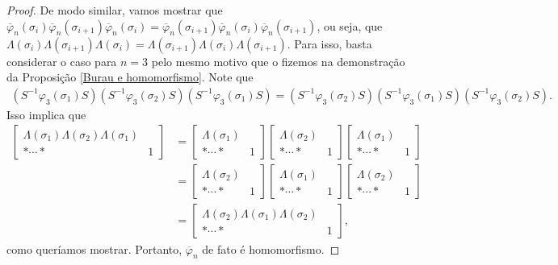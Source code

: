 \begin{proof}
		\par\vspace{0.3cm} De modo similar, vamos mostrar que
		$\overline{\varphi}_n(\sigma_i)\overline{\varphi}_n(\sigma_{i+1})\overline{\varphi}_n(\sigma_i) 
		= \overline{\varphi}_n(\sigma_{i+1})\overline{\varphi}_n(\sigma_i)\overline{\varphi}_n(\sigma_{i+1})$, 
		ou seja, que $\Lambda(\sigma_i)\Lambda(\sigma_{i+1})\Lambda(\sigma_i) =
		\Lambda(\sigma_{i+1})\Lambda(\sigma_i)\Lambda(\sigma_{i+1})$. 
		Para isso, basta considerar o caso para $n=3$ pelo mesmo motivo que o fizemos na demonstração da
		Proposição \ref{Burau e homomorfismo}. Note que
		\begin{align*}
		    (S^{-1}\varphi_3(\sigma_1)S)(S^{-1}\varphi_3(\sigma_2)S)(S^{-1}\varphi_3(\sigma_1)S) 
		    = (S^{-1}\varphi_3(\sigma_2)S)(S^{-1}\varphi_3(\sigma_1)S)(S^{-1}\varphi_3(\sigma_2)S).
		\end{align*}
		Isso implica que
		\begin{align*}
    		\left[\begin{array}{c|c}
    		\Lambda(\sigma_1)\Lambda(\sigma_2)\Lambda(\sigma_1) & \\
    		\hline 
    		\ast\cdots\ast & 1
    		\end{array}\right] &= \left[\begin{array}{c|c}
    		\Lambda(\sigma_1) & \\
    		\hline
    		\ast\cdots\ast & 1
    		\end{array}\right]\left[\begin{array}{c|c}
    		\Lambda(\sigma_2) & \\
    		\hline
    		\ast\cdots\ast & 1
    		\end{array}\right]\left[\begin{array}{c|c}
    		\Lambda(\sigma_1) & \\
    		\hline
    		\ast\cdots\ast & 1
    		\end{array}\right] \\ 
    		&= \left[\begin{array}{c|c}
    		\Lambda(\sigma_2) & \\
    		\hline
    		\ast\cdots\ast & 1
    		\end{array}\right]\left[\begin{array}{c|c}
    		\Lambda(\sigma_1) & \\
    		\hline
    		\ast\cdots\ast & 1
    		\end{array}\right]\left[\begin{array}{c|c}
    		\Lambda(\sigma_2) & \\
    		\hline
    		\ast\cdots\ast & 1
    		\end{array}\right] \\
    		&= \left[\begin{array}{c|c}
    		\Lambda(\sigma_2)\Lambda(\sigma_1)\Lambda(\sigma_2) & \\
    		\hline
    		\ast\cdots\ast & 1
    		\end{array}\right],
		\end{align*}
		como queríamos mostrar. Portanto, $\overline{\varphi}_n$ de fato é homomorfismo.
	\end{proof}

